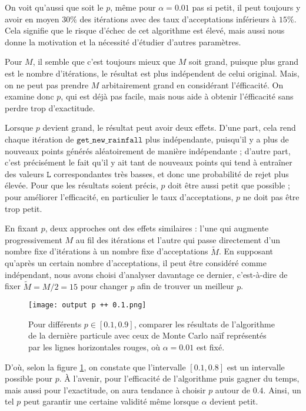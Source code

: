 \documentclass{article}
\begin{document}
On voit qu'aussi que soit le $p$, même pour $\alpha=0.01$ pas si petit, il peut toujours y avoir en moyen $30\%$ des itérations avec des taux d'acceptations inférieurs à $15\%$. Cela signifie que le risque d'échec de cet algorithme est élevé, mais aussi nous donne la motivation et la nécessité d'étudier d'autres paramètres.

Pour $M$, il semble que c'est toujours mieux que $M$ soit grand, puisque plus grand est le nombre d'itérations, le résultat est plus indépendent de celui original. Mais, on ne peut pas prendre $M$ arbitairement grand en considérant l'éfficacité. On examine donc $p$, qui est déjà pas facile, mais nous aide à obtenir l'éfficacité sans perdre trop d'exactitude.

Lorsque $p$ devient grand, le résultat peut avoir deux effets. D'une part, cela rend chaque itération de $\texttt{get\_new\_rainfall}$ plus indépendante, puisqu'il y a plus de nouveaux points générés aléatoirement de manière indépendante ; d'autre part, c'est précisément le fait qu'il y ait tant de nouveaux points qui tend à entraîner des valeurs $\texttt{L}$ correspondantes très basses, et donc une probabilité de rejet plus élevée. Pour que les résultats soient précis, $p$ doit être aussi petit que possible ; pour améliorer l'efficacité, en particulier le taux d'acceptations, $p$ ne doit pas être trop petit.

En fixant $p$, deux approches ont des effets similaires : l'une qui augmente progressivement $M$ au fil des itérations et l'autre qui passe directement d'un nombre fixe d'itérations à un nombre fixe d'acceptations $\tilde M$. En supposant qu'après un certain nombre d'acceptations, il peut être considéré comme indépendant, nous avons choisi d'analyser davantage ce dernier, c'est-à-dire de fixer $\tilde M=M/2=15$ pour changer $p$ afin de trouver un meilleur $p$.

\begin{figure}[H]
    \centering
    \texttt{[image: output p ++ 0.1.png]}
    \caption{Pour différents $p\in[0.1,0.9]$, comparer les résultats de l'algorithme de la dernière particule avec ceux de Monte Carlo naïf représentés par les lignes horizontales rouges, où $\alpha=0.01$ est fixé.}
    \label{0.4}
\end{figure}

D'où, selon la figure \ref{0.4}, on constate que l'intervalle $[0.1, 0.8]$ est un intervalle possible pour $p$. À l'avenir, pour l'efficacité de l'algorithme puis gagner du temps, mais aussi pour l'exactitude, on aura tendance à choisir $p$ autour de $0.4$. Ainsi, un tel $p$ peut garantir une certaine validité même lorsque $\alpha$ devient petit.
\end{document}
